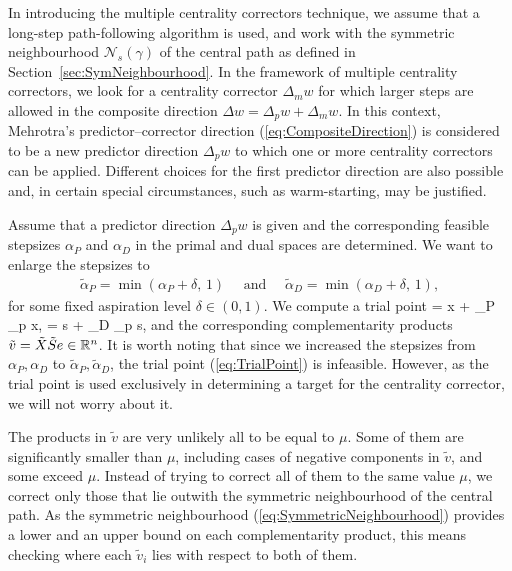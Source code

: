 In introducing the multiple centrality correctors technique,
we assume that a long-step path-following algorithm is used, 
and work with the symmetric neighbourhood $\mathcal{N}_s(\gamma)$
of the central path as defined in Section~\ref{sec:SymNeighbourhood}.
In the framework of multiple centrality correctors, we look for a 
centrality corrector $\Delta_m w$ for which larger
steps are allowed in the composite direction $\Delta w =\Delta_p w+\Delta_m w$.
In this context,
Mehrotra's predictor--corrector direction 
(\ref{eq:CompositeDirection}) is considered to be a new predictor direction
$\Delta_p w$ to which one or more centrality correctors can be applied. 
Different choices for the first predictor direction are also possible and, 
in certain special circumstances, such as warm-starting, 
may be justified.

Assume that a predictor direction $\Delta_p w$ is given 
and the corresponding
feasible stepsizes $\alpha_{P}$ and $\alpha_{D}$ 
in the primal and dual spaces are determined. 
We want to enlarge the stepsizes to 
%
\begin{eqnarray*} 
   \tilde{\alpha}_{P} = \min(\alpha_{P} \! + \! \delta, \,1) 
   \quad \mbox{ and } \quad
   \tilde{\alpha}_{D} = \min(\alpha_{D} \! + \! \delta, \,1), 
\end{eqnarray*}
%
for some fixed aspiration level $\delta \in(0,1)$. We compute a trial point
%
\be  \label{eq:TrialPoint}
   = x + \tilde{\alpha}_{P} \Delta_{p} x, \quad 
   = s + \tilde{\alpha}_{D} \Delta_{p} s,
\ee
%
and the corresponding complementarity products 
$\tilde v = \tilde X \tilde S e \in \mathbb{R}^{n}$.
It is worth noting that since we increased the stepsizes from 
$\alpha_P,\alpha_D$ to $\tilde \alpha_P,\tilde \alpha_D$,
the trial point (\ref{eq:TrialPoint}) is infeasible.
However, as the trial point is used exclusively in
determining a target for the centrality corrector, we will not
worry about it.

The products in $\tilde v$ are very unlikely all to be equal to $\mu$.
Some of them are significantly smaller than $\mu$, 
including cases of negative components in $\tilde v$, 
and some exceed $\mu$. Instead of trying to correct 
all of them to the same value $\mu$, we correct only those that
lie outwith the symmetric neighbourhood of the central path.
As the symmetric neighbourhood (\ref{eq:SymmetricNeighbourhood})
provides a lower and an upper bound on each complementarity product,
this means checking where each $\tilde v_i$ lies with respect to
both of them.

